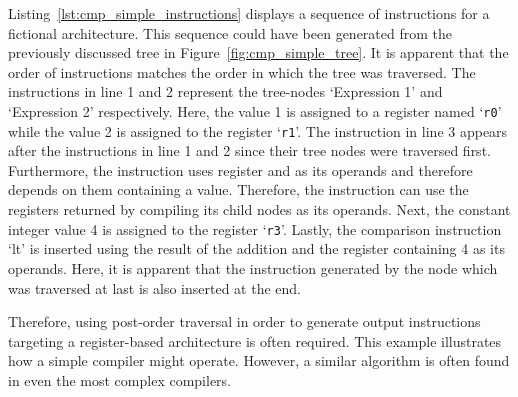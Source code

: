 
Listing~\ref{lst:cmp_simple_instructions} displays a sequence of instructions for a fictional architecture.
This sequence could have been generated from the previously discussed tree in Figure~\ref{fig:cmp_simple_tree}.
It is apparent that the order of instructions matches the order in which the tree was traversed.
The instructions in line 1 and 2 represent the tree-nodes `Expression 1' and `Expression 2' respectively.
Here, the value 1 is assigned to a register named `\texttt{r0}' while the value 2 is assigned to the register `\texttt{r1}'.
The  instruction in line 3 appears after the instructions in line 1 and 2 since their tree nodes were traversed first.
Furthermore, the instruction uses register  and  as its operands and therefore depends on them containing a value.
Therefore, the  instruction can use the registers returned by compiling its child nodes as its operands.
Next, the constant integer value 4 is assigned to the register `\texttt{r3}'.
Lastly, the comparison instruction `lt' is inserted using the result of the addition and the register containing 4 as its operands.
Here, it is apparent that the instruction generated by the node which was traversed at last is also inserted at the end.

Therefore, using post-order traversal in order to generate output instructions targeting a register-based architecture is often required.
This example illustrates how a simple compiler might operate.
However, a similar algorithm is often found in even the most complex compilers.
